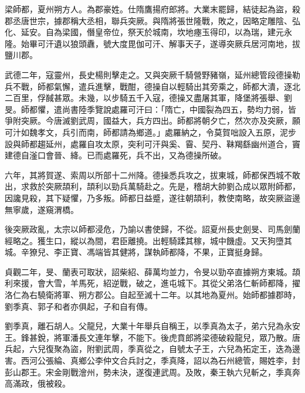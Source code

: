 \begin{pinyinscope}
 梁師都，夏州朔方人。為郡豪姓。仕隋鷹揚府郎將。大業末罷歸，結徒起為盜，殺郡丞唐世宗，據郡稱大丞相，聯兵突厥。與隋將張世隆戰，敗之，因略定雕陰、弘化、延安。自為梁國，僭皇帝位，祭天於城南，坎地瘞玉得印，以為瑞，建元永隆。始畢可汗遺以狼頭纛，號大度毘伽可汗、解事天子，遂導突厥兵居河南地，拔鹽川郡。



 武德二年，寇靈州，長史楊則擊走之。又與突厥千騎營野豬嶺，延州總管段德操勒兵不戰，師都氣懈，遣兵進擊，戰酣，德操自以輕騎出其旁乘之，師都大潰，逐北二百里，俘馘甚眾。未幾，以步騎五千入寇，德操又盡屠其軍，降堡將張舉、劉旻。師都懼，遣尚書陸季覽說處羅可汗曰：「隋亡，中國裂為四五，勢均力弱，皆爭附突厥。今唐滅劉武周，國益大，兵方四出。師都將朝夕亡，然次亦及突厥，願可汁如魏孝文，兵引而南，師都請為鄉道。」處羅納之，令莫賀咄設入五原，泥步設與師都趨延州，處羅自攻太原，突利可汗與奚、霫、契丹、靺羯繇幽州道合，竇建德自滏口會晉、絳。已而處羅死，兵不出，又為德操所破。



 六年，其將賀遂、索周以所部十二州降。德操悉兵攻之，拔東城，師都保西城不敢出，求救於突厥頡利，頡利以勁兵萬騎赴之。先是，稽胡大帥劉屳成以眾附師都，因讒見殺，其下疑懼，乃多叛。師都日益蹙，遂往朝頡利，教使南略，故突厥盜邊無寧歲，遂窺渭橋。



 後突厥政亂，太宗以師都浸危，乃諭以書使歸，不從。詔夏州長史劍旻、司馬劍蘭經略之。獲生口，縱以為間，君臣離撓。出輕騎蹂其稼，城中饑虛。又天狗墮其城。辛獠兒、李正寶、馮端皆其健將，謀執師都降，不果，正寶挺身歸。



 貞觀二年，旻、蘭表可取狀，詔柴紹、薛萬均並力，令旻以勁卒直據朔方東城。頡利來援，會大雪，羊馬死，紹逆戰，破之，進屯城下。其從父弟洛仁斬師都降，擢洛仁為右驍衛將軍、朔方郡公。自起至滅十二年。以其地為夏州。始師都據郡時，劉季真、郭子和者亦俱起，子和自有傳。



 劉季真，離石胡人。父龍兒，大業十年舉兵自稱王，以季真為太子，弟六兒為永安王。鋒甚銳，將軍潘長文連年擊，不能下。後虎賁郎將梁德破殺龍兒，眾乃散。唐兵起，六兒復聚為盜，附劉武周，季真從之，自號太子王，六兒為拓定王，迭為邊害。西河公張綸、真鄉公李仲文合兵討之，季真降，詔以為石州總管，賜姓李，封彭山郡王。宋金剛戰澮州，勢未決，遂復連武周。及敗，秦王執六兒斬之，季真奔高滿政，俄被殺。



\end{pinyinscope}